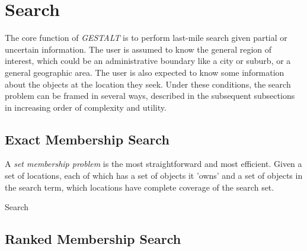 \section{Search}
\label{section:search}

The core function of \textit{GESTALT} is to perform last-mile search given partial or uncertain information.
The user is assumed to know the general region of interest, which could be an administrative boundary like a city or suburb, or a general geographic area.
The user is also expected to know some information about the objects at the location they seek.
Under these conditions, the search problem can be framed in several ways, described in the subsequent subsections in increasing order of complexity and utility.

\subsection{Exact Membership Search}

A \textit{set membership problem} is the most straightforward and most efficient. Given a set of locations, each of which has a set of objects it 'owns' and a set of objects in the search term, which locations have complete coverage of the search set.


\begin{algorithm}
    \caption{Search}\label{alg:search}
    \begin{algorithmic}
        \State{- - - - -}
            \EndFor
            \EndProcedure
    \end{algorithmic}
\end{algorithm}


\subsection{Ranked Membership Search}

